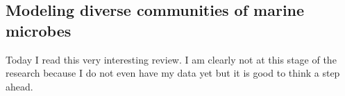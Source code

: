 \subsection{Modeling diverse communities of marine microbes \citep{follows2011modeling}}
\label{task:20180309_cj0}

Today I read this very interesting review. I am clearly not at this stage of the research because I do not even have my data yet but it is good to think a step ahead.

